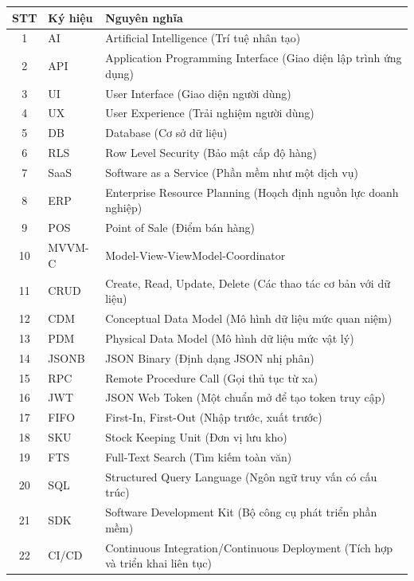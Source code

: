 \documentclass[13pt, a4paper]{report}
\begin{document}

\begin{tabularx}{\textwidth}{|c|l|X|}
    \hline
    \rowcolor{tablegray}
    \textbf{STT} & \textbf{Ký hiệu} & \textbf{Nguyên nghĩa} \\
    \hline
    
    1 & AI & Artificial Intelligence (Trí tuệ nhân tạo) \\ \hline
    2 & API & Application Programming Interface (Giao diện lập trình ứng dụng) \\ \hline
    3 & UI & User Interface (Giao diện người dùng) \\ \hline
    4 & UX & User Experience (Trải nghiệm người dùng) \\ \hline
    5 & DB & Database (Cơ sở dữ liệu) \\ \hline
    6 & RLS & Row Level Security (Bảo mật cấp độ hàng) \\ \hline
    7 & SaaS & Software as a Service (Phần mềm như một dịch vụ) \\ \hline
    8 & ERP & Enterprise Resource Planning (Hoạch định nguồn lực doanh nghiệp) \\ \hline
    9 & POS & Point of Sale (Điểm bán hàng) \\ \hline
    10 & MVVM-C & Model-View-ViewModel-Coordinator \\ \hline
    11 & CRUD & Create, Read, Update, Delete (Các thao tác cơ bản với dữ liệu) \\ \hline
    12 & CDM & Conceptual Data Model (Mô hình dữ liệu mức quan niệm) \\ \hline
    13 & PDM & Physical Data Model (Mô hình dữ liệu mức vật lý) \\ \hline
    14 & JSONB & JSON Binary (Định dạng JSON nhị phân) \\ \hline
    15 & RPC & Remote Procedure Call (Gọi thủ tục từ xa) \\ \hline
    16 & JWT & JSON Web Token (Một chuẩn mở để tạo token truy cập) \\ \hline
    17 & FIFO & First-In, First-Out (Nhập trước, xuất trước) \\ \hline
    18 & SKU & Stock Keeping Unit (Đơn vị lưu kho) \\ \hline
    19 & FTS & Full-Text Search (Tìm kiếm toàn văn) \\ \hline
    20 & SQL & Structured Query Language (Ngôn ngữ truy vấn có cấu trúc) \\ \hline
    21 & SDK & Software Development Kit (Bộ công cụ phát triển phần mềm) \\ \hline
    22 & CI/CD & Continuous Integration/Continuous Deployment (Tích hợp và triển khai liên tục) \\ \hline


\end{tabularx}
\end{document}
